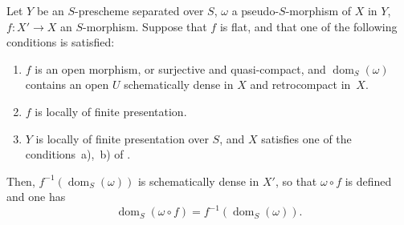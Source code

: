 \begin{proposition}[20.3.11]
\label{IV.20.3.11}
Let $Y$ be an $S$-prescheme separated over $S$, $\omega$ a pseudo-$S$-morphism of $X$ in $Y$, $f:X'\to X$ an $S$-morphism.
Suppose that $f$ is flat, and that one of the following conditions is satisfied:
\begin{enumerate}[label=\emph{(\roman*)}]
  \item $f$ is an open morphism, or surjective and quasi-compact, and $\operatorname{dom}_S(\omega)$ contains an open $U$ schematically dense in $X$ and retrocompact in~$X$.
  \item $f$ is locally of finite presentation.
  \item $Y$ is locally of finite presentation over $S$, and $X$ satisfies one of the conditions~a),~b) of .
\end{enumerate}
Then, $f^{-1}(\operatorname{dom}_S(\omega))$ is schematically dense in $X'$, so that $\omega\circ f$ is defined  and one has
\[
\label{IV.20.3.11.1}
  \operatorname{dom}_S(\omega\circ f)=f^{-1}(\operatorname{dom}_S(\omega)).
  \tag{20.3.11.1}
\]
\end{proposition}

